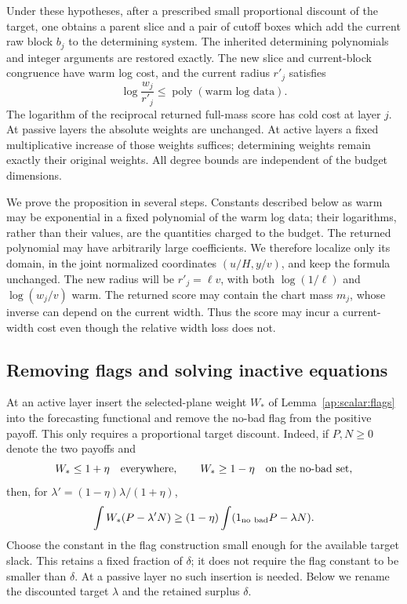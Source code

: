 \begin{proposition}\label{ap:macro:extraction}
Under these hypotheses, after a prescribed small proportional discount
of the target, one obtains a parent slice and a pair of cutoff boxes
which add the current raw block $b_j$ to the determining system.
The inherited determining polynomials and integer arguments are
restored exactly.  The new slice and current-block congruence have
warm log cost, and the current radius $r'_j$ satisfies
\[
             \log\frac{w_j}{r'_j}
                    \le \operatorname{poly}(\text{warm log data}).
\]
The logarithm of the reciprocal returned full-mass score has cold cost
at layer $j$.  At passive layers the absolute weights are unchanged.
At active layers a fixed multiplicative increase of those weights
suffices; determining weights remain exactly their original weights.
All degree bounds are independent of the budget dimensions.
\end{proposition}

We prove the proposition in several steps.  Constants described below
as warm may be exponential in a fixed polynomial of the warm log data;
their logarithms, rather than their values, are the quantities charged
to the budget.  The returned polynomial may have arbitrarily large
coefficients.  We therefore localize only its domain, in the joint
normalized coordinates $(u/H,y/v)$, and keep the formula unchanged.
The new radius will be $r'_j=\ell v$, with both $\log(1/\ell)$ and
$\log(w_j/v)$ warm.  The returned score may contain the chart mass
$m_j$, whose inverse can depend on the current width.  Thus the score
may incur a current-width cost even though the relative width loss
does not.

\subsection{Removing flags and solving inactive equations}

At an active layer insert the selected-plane weight $W_*$ of
Lemma~\ref{ap:scalar:flags} into the forecasting functional and remove
the no-bad flag from the positive payoff.  This only requires a
proportional target discount.  Indeed, if $P,N\ge0$ denote the two
payoffs and
\[
 W_*\le1+\eta\quad\hbox{everywhere},\qquad
 W_*\ge1-\eta\quad\hbox{on the no-bad set},
\]
then, for $\lambda'=(1-\eta)\lambda/(1+\eta)$,
\begin{equation}\label{ap:macro:weight-discount}
 \int W_*(P-\lambda'N)
 \ge (1-\eta)\int(1_{\rm no\ bad}P-\lambda N).
\end{equation}
Choose the constant in the flag construction small enough for the
available target slack.  This retains a fixed fraction of $\delta$;
it does not require the flag constant to be smaller than $\delta$.
At a passive layer no such insertion is needed.  Below we rename the
discounted target $\lambda$ and the retained surplus $\delta$.

